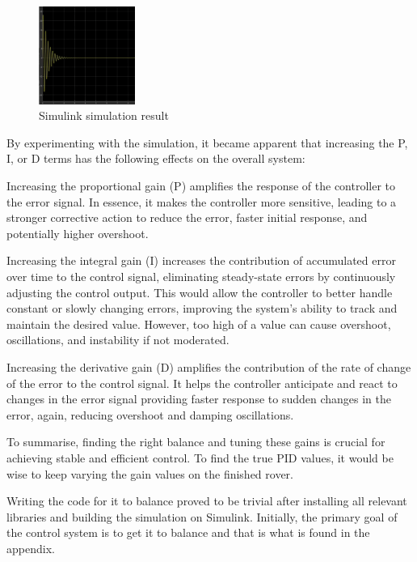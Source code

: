 \begin{figure}
    \centerline{\includegraphics[width=0.28\textwidth]{images/simulation-result.png}}
    \caption{Simulink simulation result}
    \label{fig:simulation-result}
\end{figure}

By experimenting with the simulation, it became apparent that increasing the P, I, or D terms has the following effects on the overall system:

Increasing the proportional gain (P) amplifies the response of the controller to the error signal. In essence, it makes the controller more sensitive, leading to a stronger corrective action to reduce the error, faster initial response, and potentially higher overshoot.

Increasing the integral gain (I) increases the contribution of accumulated error over time to the control signal, eliminating steady-state errors by continuously adjusting the control output. This would allow the controller to better handle constant or slowly changing errors, improving the system's ability to track and maintain the desired value. However, too high of a value can cause overshoot, oscillations, and instability if not moderated.

Increasing the derivative gain (D) amplifies the contribution of the rate of change of the error to the control signal. It helps the controller anticipate and react to changes in the error signal providing faster response to sudden changes in the error, again, reducing overshoot and damping oscillations.

To summarise, finding the right balance and tuning these gains is crucial for achieving stable and efficient control. To find the true PID values, it would be wise to keep varying the gain values on the finished rover.

Writing the code for it to balance proved to be trivial after installing all relevant libraries and building the simulation on Simulink. Initially, the primary goal of the control system is to get it to balance and that is what is found in the appendix.


